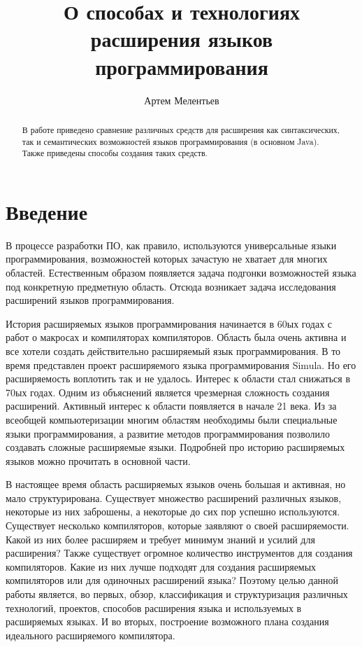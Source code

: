 \documentclass[a4paper,12pt]{article}
\begin{document}
\title{О способах и технологиях расширения языков программирования}
\author{Артем Мелентьев}
\maketitle

\begin{abstract}
В работе приведено сравнение различных средств для расширения как
синтаксических, так и семантических возможностей языков программирования (в
основном Java). Также приведены способы создания таких средств.
\end{abstract}

\tableofcontents

\section{Введение}

В процессе разработки ПО, как правило, используются универсальные языки
программирования, возможностей которых зачастую не хватает для многих областей.
Естественным образом появляется задача подгонки возможностей языка под
конкретную предметную область. Отсюда возникает задача исследования расширений
языков программирования.

История расширяемых языков программирования начинается в 60ых годах с работ о
макросах и компиляторах компиляторов. Область была очень активна и все хотели
создать действительно расширяемый язык программирования. В то время
представлен проект расширяемого языка программирования Simula. Но его
расширяемость воплотить так и не удалось. Интерес к области стал снижаться в 70ых
годах. Одним из объяснений является чрезмерная сложность создания расширений.
Активный интерес к области появляется в начале 21 века. Из за всеобщей
компьютеризации многим областям необходимы были специальные языки
программирования, а развитие методов программирования позволило создавать
сложные расширяемые языки. Подробней про историю расширяемых языков можно
прочитать в основной части.

В настоящее время область расширяемых языков очень большая и активная, но мало
структурирована. Существует множество расширений различных языков, некоторые из
них заброшены, а некоторые до сих пор успешно используются. Существует несколько
компиляторов, которые заявляют о своей расширяемости. Какой из них более
расширяем и требует минимум знаний и усилий для расширения? Также существует
огромное количество инструментов для создания компиляторов. Какие из них лучше
подходят для создания расширяемых компиляторов или для одиночных расширений языка?
Поэтому целью данной работы является, во первых, обзор, классификация и
структуризация различных технологий, проектов, способов расширения языка и
используемых в расширяемых языках. И во вторых, построение возможного плана
создания идеального расширяемого компилятора.
\end{document}
